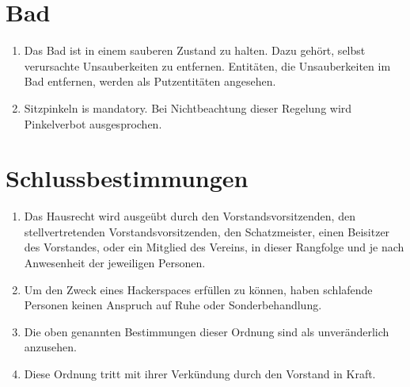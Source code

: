 \documentclass[12pt,a4paper]{scrartcl}
\begin{document}
\section{Bad}
\begin{enumerate}
  \item Das Bad ist in einem sauberen Zustand zu halten. Dazu gehört, selbst
    verursachte Unsauberkeiten zu entfernen. Entitäten, die Unsauberkeiten im
    Bad entfernen, werden als Putzentitäten angesehen.

  \item Sitzpinkeln is mandatory. Bei Nichtbeachtung dieser Regelung wird
    Pinkelverbot ausgesprochen.
\end{enumerate}

\section{Schlussbestimmungen}
\begin{enumerate}
  \item Das Hausrecht wird ausgeübt durch den Vorstandsvorsitzenden, den
    stellvertretenden Vorstandsvorsitzenden, den Schatzmeister, einen Beisitzer
    des Vorstandes, oder ein Mitglied des Vereins, in dieser Rangfolge und je
    nach Anwesenheit der jeweiligen Personen.

  \item Um den Zweck eines Hackerspaces erfüllen zu können, haben schlafende
    Personen keinen Anspruch auf Ruhe oder Sonderbehandlung.

  \item Die oben genannten Bestimmungen dieser Ordnung sind als unveränderlich
    anzusehen.

  \item Diese Ordnung tritt mit ihrer Verkündung durch den Vorstand in Kraft.
\end{enumerate}
\end{document}
